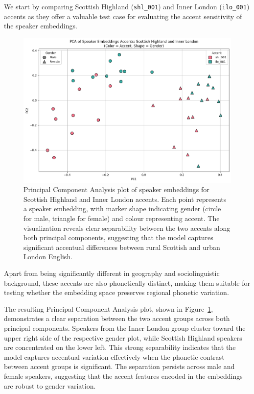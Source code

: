 \documentclass[conference]{IEEEtran}
\begin{document}
We start by comparing  Scottish Highland (\texttt{shl\_001}) and Inner London (\texttt{ilo\_001}) accents as they offer a valuable test case for evaluating the accent sensitivity of the speaker embeddings. 


\begin{figure}[H]
	\centering
	\includegraphics[width=0.7\linewidth]{img/img-cluster-shl-ilo}
	\caption{Principal Component Analysis plot of speaker embeddings for Scottish Highland and Inner London  accents. Each point represents a speaker embedding, with marker shape indicating gender (circle for male, triangle for female) and colour representing accent. The visualization reveals clear separability between the two accents along both principal components, suggesting that the model captures significant accentual differences between rural Scottish and urban London English.}
	\label{fig:img-cluster-shl-ilo}
\end{figure}


Apart from being significantly different in geography and sociolinguistic background, these accents are also phonetically distinct, making them suitable for testing whether the embedding space preserves regional phonetic variation.

The resulting Principal Component Analysis plot, shown in Figure~\ref{fig:img-cluster-shl-ilo}, demonstrates a clear separation between the two accent groups across both principal components. Speakers from the Inner London group cluster toward the upper right side of the respective gender plot, while Scottish Highland speakers are concentrated on the lower left. This strong separability indicates that the model captures accentual variation effectively when the phonetic contrast between accent groups is significant. The separation persists across male and female speakers, suggesting that the accent features encoded in the embeddings are robust to gender variation.
\end{document}
